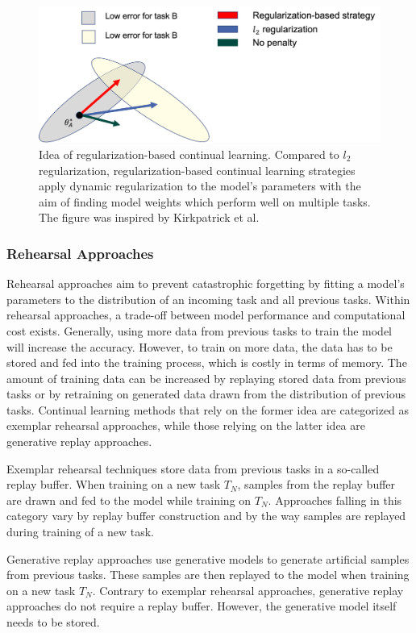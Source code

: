 \begin{figure} [ht]
    \centering
    \includegraphics[width=.9\linewidth]{images/regularization_idea.png}
    \caption[Idea of regularization-based continual learning]{Idea of regularization-based continual learning. Compared to $l_2$ regularization,
    regularization-based continual learning strategies apply dynamic regularization to the model's parameters with the aim of finding model
    weights which perform well on multiple tasks. The figure was inspired by Kirkpatrick et al. \cite{kirkpatrick2017overcoming}}
    \label{fig:ContinualLearning:ReulgarizationIdea}
  \end{figure}

\subsubsection{Rehearsal Approaches}
\label{sec:RehearsalApproaches}
Rehearsal approaches aim to prevent catastrophic forgetting by fitting a model's parameters to the distribution
of an incoming task and all previous tasks. Within rehearsal approaches, a trade-off between
model performance and computational cost exists. Generally, using more data from previous tasks to train the model will increase the accuracy. 
However, to train on more data, the data has to be stored and fed into the training process, which is costly in terms of memory.
The amount of training data can be increased by replaying stored data from previous tasks or by
retraining on generated data drawn from the distribution of previous tasks. Continual learning methods that rely on the former idea are
categorized as exemplar rehearsal approaches, while those relying on the latter idea are generative replay
approaches. \par
Exemplar rehearsal techniques store data from previous tasks in a so-called replay buffer. When training on a new task $T_N$, samples
from the replay buffer are drawn and fed to the model while training on $T_N$. Approaches falling in this category vary by replay buffer
construction and by the way samples are replayed during training of a new task. \par
Generative replay approaches use generative models to generate artificial samples from previous tasks. These samples are then replayed to
the model when training on a new task $T_N$. Contrary to exemplar rehearsal approaches, generative replay approaches do not require a replay buffer.
However, the generative model itself needs to be stored. 

